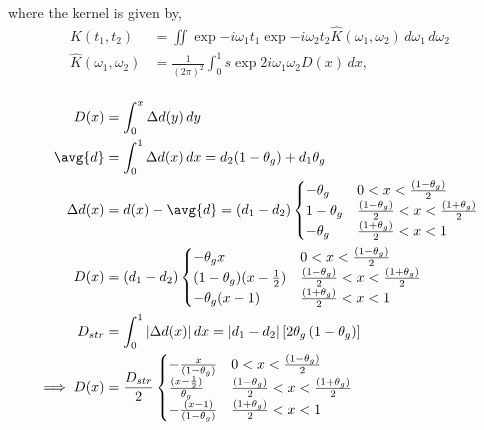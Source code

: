 where the kernel is given by,
\begin{equation}\label{equ:DMCGLE_Kernal}
\begin{split}
K(t_1,t_2) &= \iint \exp{-i \omega_1 t_1} \exp{-i \omega_2 t_2 }   \hat{K}(\omega_1,\omega_2) \,d\omega_1 \,d\omega_2 \\
\hat{K}(\omega_1,\omega_2) &= \frac{1}{(2\pi)^2}\int_{0}^{1}s \exp{2i \omega_1\omega_2 D(x)}  \,dx,  \\
\end{split}
\end{equation}

\begin{equation}
\begin{split}
D(x)&= \int_{0}^{x} \Delta d(y) \, dy\\
\avg{d} &= \int_{0}^{1} \Delta d(x) \,dx = d_{2}(1-\theta_g) + d_{1}\theta_g\\
\Delta d(x)&= d(x) - \avg{d} = \left(d_{1}-d_{2}\right) 
\begin{cases} -\theta_g & 0 < x < \frac{(1- \theta_{g})}{2} \\
1-\theta_g & \frac{(1- \theta_{g})}{2} < x < \frac{(1+ \theta_{g})}{2}  \\
-\theta_g &  \frac{(1+ \theta_{g})}{2}  < x < 1\end{cases}\\
D(x) &= \left(d_{1}-d_{2}\right) \begin{cases} -\theta_g x & 0 < x < \frac{(1- \theta_{g})}{2} \\
(1-\theta_g) (x-\frac{1}{2}) & \frac{(1- \theta_{g})}{2} < x < \frac{(1+ \theta_{g})}{2}  \\
-\theta_g (x-1) &  \frac{(1+ \theta_{g})}{2}  < x < 1\end{cases}\\
D_{str} &= \int_{0}^{1} |\Delta d(x)| \, dx = |d_{1} - d_{2}|\left[2\theta_g\left(1-\theta_g\right)\right]\\
\implies D(x) &= \frac{D_{str}}{2}  \begin{cases} - \frac{x}{(1- \theta_{g})} & 0 < x < \frac{(1- \theta_{g})}{2} \\
\frac{(x-\frac{1}{2})}{\theta_g}  & \frac{(1- \theta_{g})}{2} < x < \frac{(1+ \theta_{g})}{2}  \\
- \frac{(x-1)}{(1- \theta_{g})} &  \frac{(1+ \theta_{g})}{2}  < x < 1\end{cases}\\
\end{split}
\end{equation}
